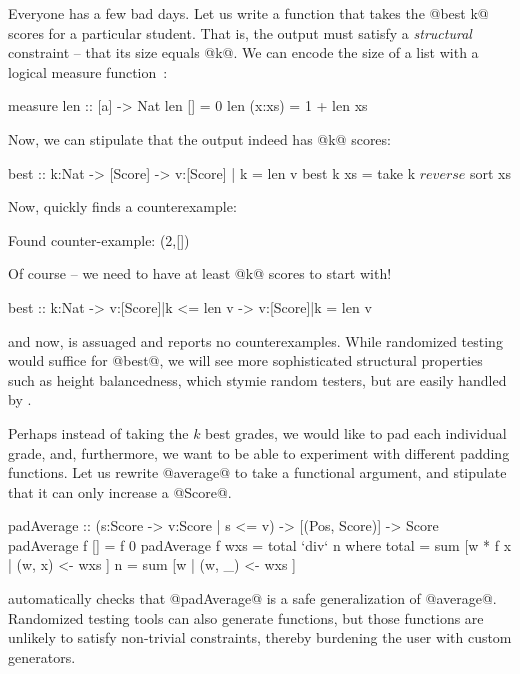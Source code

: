Everyone has a few bad days. Let us write a function that takes the 
@best k@ scores for a particular student. That is, the output
must satisfy a \emph{structural} constraint -- that its size 
equals @k@. We can encode the size of a list with a logical 
measure function~\cite{VazouICFP14}:
%
\begin{code}
  measure len :: [a] -> Nat
  len []      = 0
  len (x:xs)  = 1 + len xs
\end{code}
%
Now, we can stipulate that the output indeed has @k@ scores:
%
\begin{code}
  best      :: k:Nat -> [Score] -> {v:[Score] | k = len v}
  best k xs = take k $ reverse $ sort xs
\end{code}
%
Now, \toolname quickly finds a counterexample:
%
\begin{code}
  Found counter-example: (2,[])
\end{code}
%
Of course -- we need to have at least @k@ scores to start with! 
%
\begin{code}
best :: k:Nat -> {v:[Score]|k <= len v} -> {v:[Score]|k = len v}
\end{code}
%
and now, \toolname is assuaged and reports no counterexamples.
%
While randomized testing would suffice for @best@, we will see 
more sophisticated structural properties such as height balancedness, 
which stymie random testers, but are easily handled by \toolname.

Perhaps instead of taking the $k$ best grades, we would like
to pad each individual grade, and, furthermore, we want to
be able to experiment with different padding functions. Let
us rewrite @average@ to take a functional argument, and
stipulate that it can only increase a @Score@.
%
\begin{code}
  padAverage       :: (s:Score -> {v:Score | s <= v}) 
                   -> [(Pos, Score)] -> Score
  padAverage f []  = f 0
  padAverage f wxs = total `div` n
    where
      total   = sum [w * f x | (w, x) <- wxs ]
      n       = sum [w       | (w, _) <- wxs ]
\end{code}
%
\toolname automatically checks that @padAverage@ is 
a safe generalization of @average@. Randomized 
testing tools can also generate functions, but those 
functions are unlikely to satisfy non-trivial constraints, 
thereby burdening the user with custom generators.


